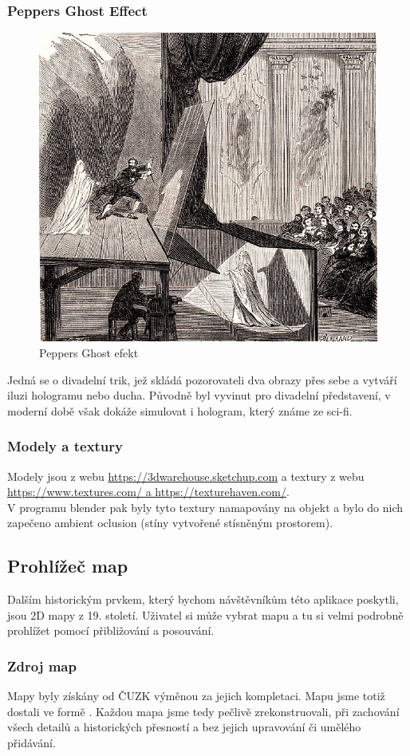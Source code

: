 \subsubsection{Peppers Ghost Effect}
\begin{figure}[H]
	\centering
	\includegraphics[width=.5\textwidth]{img/Peppers_Ghost.jpg}
	\caption[Peppers Ghost efekt - zdroj: \url{https://commons.wikimedia.org/wiki/File:Peppers_Ghost.jpg}]{Peppers Ghost efekt}
\end{figure}

Jedná se o divadelní trik, jež skládá pozorovateli dva obrazy přes sebe a vytváří iluzi
hologramu nebo ducha. Původně byl vyvinut pro divadelní představení, v moderní
době však dokáže simulovat i hologram, který známe ze sci-fi.

\subsubsection{Modely a textury}
Modely jsou z webu \url{https://3dwarehouse.sketchup.com} a
textury z webu \url{https://www.textures.com/ a https://texturehaven.com/}.\\
V programu blender pak byly tyto textury namapovány na objekt a bylo do nich
zapečeno ambient oclusion (stíny vytvořené stísněným prostorem).



\subsection{Prohlížeč map}
Dalším historickým prvkem, který bychom návštěvníkům této aplikace poskytli, jsou
2D mapy z 19. století. Uživatel si může vybrat mapu a tu si velmi podrobně
prohlížet pomocí přibližování a posouvání.

\subsubsection{Zdroj map}
Mapy byly získány od ČUZK výměnou za jejich kompletaci.
Mapu jsme totiž dostali ve formě .
Každou mapa jsme tedy pečlivě zrekonstruovali, při zachování všech detailů a
historických přesností a bez jejich upravování či umělého přidávání.
